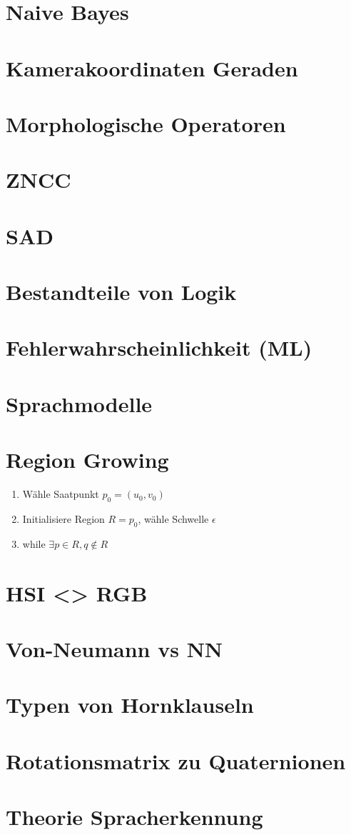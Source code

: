 \documentclass[paper=a4, fontsize=11pt]{scrartcl} %
\numberwithin{equation}{section} %
\numberwithin{figure}{section} %
\numberwithin{table}{section} %
\begin{document}
\section{Naive Bayes}

\section{Kamerakoordinaten Geraden}

\section{Morphologische Operatoren}

\section{ZNCC}

\section{SAD}

\section{Bestandteile von Logik}

\section{Fehlerwahrscheinlichkeit (ML)}

\section{Sprachmodelle}

\section{Region Growing}

\begin{enumerate}
\item Wähle Saatpunkt $p_0 = (u_0,v_0)$
\item Initialisiere Region $R = {p_0}$, wähle Schwelle $\epsilon$
\item while $\exists p \in R, q \not\in R$
\end{enumerate}

\section{HSI <> RGB}

\section{Von-Neumann vs NN}

\section{Typen von Hornklauseln}

\section{Rotationsmatrix zu Quaternionen}

\section{Theorie Spracherkennung}
\end{document}
